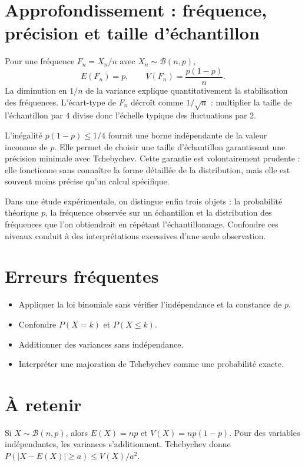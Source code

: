 \section{Approfondissement : fréquence, précision et taille d’échantillon}
Pour une fréquence $F_n=X_n/n$ avec $X_n\sim\mathcal{B}(n,p)$,
\[
E(F_n)=p,\qquad V(F_n)=\frac{p(1-p)}{n}.
\]
La diminution en $1/n$ de la variance explique quantitativement la stabilisation des fréquences. L’écart-type de $F_n$ décroît comme $1/\sqrt n$ : multiplier la taille de l’échantillon par $4$ divise donc l’échelle typique des fluctuations par $2$.

L’inégalité $p(1-p)\leq1/4$ fournit une borne indépendante de la valeur inconnue de $p$. Elle permet de choisir une taille d’échantillon garantissant une précision minimale avec Tchebychev. Cette garantie est volontairement prudente : elle fonctionne sans connaître la forme détaillée de la distribution, mais elle est souvent moins précise qu’un calcul spécifique.

Dans une étude expérimentale, on distingue enfin trois objets : la probabilité théorique $p$, la fréquence observée sur un échantillon et la distribution des fréquences que l’on obtiendrait en répétant l’échantillonnage. Confondre ces niveaux conduit à des interprétations excessives d’une seule observation.

\section{Erreurs fréquentes}
\begin{itemize}
\item Appliquer la loi binomiale sans vérifier l’indépendance et la constance de $p$.
\item Confondre $P(X=k)$ et $P(X\leq k)$.
\item Additionner des variances sans indépendance.
\item Interpréter une majoration de Tchebychev comme une probabilité exacte.
\end{itemize}

\section{À retenir}
\begin{aretenir}
Si $X\sim\mathcal{B}(n,p)$, alors $E(X)=np$ et $V(X)=np(1-p)$. Pour des variables indépendantes, les variances s’additionnent. Tchebychev donne $P(|X-E(X)|\geq a)\leq V(X)/a^2$.
\end{aretenir}

